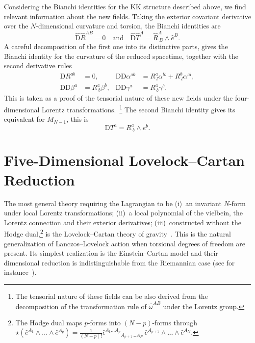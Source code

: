 \documentclass[aps,prd,12pt,superscriptaddress,showpacs,showkeys,longbibliography,reprint,nofootinbib]{revtex4-1}
\begin{document}
Considering the Bianchi identities for the KK structure described above, we find relevant information about the new fields. Taking the exterior covariant derivative over the $N$-dimensional curvature and torsion, the Bianchi identities are
\begin{equation}
  \hat{\text{D}}\hat{R}^{AB} = 0 \quad \text{and} \quad \hat{\text{D}}\hat{T}^A = \hat{R}^A_{\ B}\wedge\hat{e}^B.
\end{equation}
A careful decomposition of the first one into its distinctive parts, gives the Bianchi identity for the curvature of the reduced spacetime, together with the second derivative rules
\begin{equation}
  \begin{aligned}
    \text{D}R^{ab} &=0, & \text{D}\mbox{D}\alpha^{ab} &=R^a_{\ l}\alpha^{lb}+R^b_{\ l}\alpha^{al},\\
    \text{D}\text{D}\beta^a &= R^a_{\ b}\beta^{b}, & \text{D}\text{D}\gamma^a &= R^a_{\ b}\gamma^{b}.
  \end{aligned}
\end{equation}
This is taken as a proof of the tensorial nature of these new fields under the four-dimensional Lorentz transformations.~\footnote{The tensorial nature of these fields can be also derived from the decomposition of the transformation rule of $\hat{\omega}^{AB}$ under the Lorentz group.} The second Bianchi identity gives its equivalent for $M_{N-1}$, this is
\begin{equation*}
  \mbox{D}T^a=R^a_{\ b}\wedge e^b.
\end{equation*}


\section{Five-Dimensional Lovelock--Cartan Reduction\label{5EGB}}

The most general theory requiring the Lagrangian to be (i)~an invariant $N$-form under local Lorentz transformations; (ii)~a local polynomial of the vielbein, the Lorentz connection and their exterior derivatives; (iii)~constructed without the Hodge dual,\footnote{The Hodge dual maps $p$-forms into $(N-p)$-forms through $\star\left(\hat{e}^{A_1}\wedge ... \wedge\hat{e}^{A_p}\right) = \frac{1}{(N-p)!}\hat{\epsilon}^{A_1\ldots A_p}{}_{A_{p+1}...A_N}\,\hat{e}^{A_{p+1}}\wedge ... \wedge\hat{e}^{A_N}$.} is the Lovelock--Cartan theory of gravity~\cite{Mardones:1990qc}. This is the natural generalization of Lanczos--Lovelock action when torsional degrees of freedom are present. Its simplest realization is the Einstein--Cartan model and their dimensional reduction is indistinguishable from the Riemannian case (see for instance~\cite{German:1993bq,Aros:2007nn}). 
\end{document}

